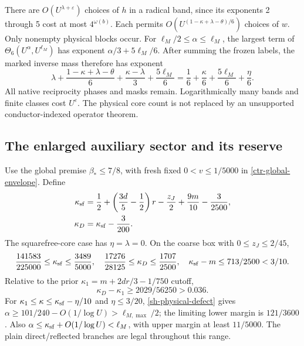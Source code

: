 \documentclass[11pt]{article}
\theoremstyle{definition}
\newcommand{\eps}{\varepsilon}
\begin{document}
There are $O(U^{\lambda+\eps})$ choices of $h$ in a radical band,
since its exponents 2 through 5 cost at most $4^{\omega(b)}$.
Each permits $O(U^{(1-\kappa+\lambda-\theta)/6})$ choices of $w$.
Only nonempty physical blocks occur. For
$\ell_M/2\le\alpha\le\ell_M$, the largest term of
$\Theta_6(U^\alpha,U^{\ell_M})$ has exponent
$\alpha/3+5\ell_M/6$. After summing the frozen labels, the marked
inverse mass therefore has exponent
\begin{equation}\label{sh-defect-mass}
 \lambda+\frac{1-\kappa+\lambda-\theta}{6}
       +\frac{\kappa-\lambda}{3}+\frac{5\ell_M}{6}
 =\frac16+\frac{\kappa}{6}+\frac{5\ell_M}{6}+\frac{\eta}{6}.
\end{equation}
All native reciprocity phases and masks remain. Logarithmically many
bands and finite classes cost $U^\eps$. The physical core count is
not replaced by an unsupported conductor-indexed operator theorem.

\subsection{The enlarged auxiliary sector and its reserve}
Use the global premise $\beta_*\le7/8$, with fresh fixed
$0<v\le1/5000$ in \eqref{ctr-global-envelope}. Define
\begin{align*}
 \kappa_{\rm sf}
 &=\frac12+\left(\frac{3d}{5}-\frac12\right)r
             -\frac{z_J}{2}+\frac{9m}{10}-\frac3{2500},\\
 \kappa_D&=\kappa_{\rm sf}-\frac3{200}.
\end{align*}
The squarefree-core case has $\eta=\lambda=0$.
On the coarse box with $0\le z_J\le2/45$,
\[
 \frac{141583}{225000}\le\kappa_{\rm sf}\le\frac{3489}{5000},
 \quad \frac{17276}{28125}\le\kappa_D\le\frac{1707}{2500},
 \quad \kappa_{\rm sf}-m\le713/2500<3/10.
\]
Relative to the prior $\kappa_1=m+2dr/3-1/750$ cutoff,
\[
 \kappa_D-\kappa_1\ge2029/56250>0.036 .
\]
For $\kappa_1\le\kappa\le\kappa_{\rm sf}-\eta/10$ and $\eta\le3/20$,
\eqref{sh-physical-defect} gives
$\alpha\ge101/240-O(1/\log U)>\ell_{M,\max}/2$; the limiting lower margin is
$121/3600$. Also $\alpha\le\kappa_{\rm sf}+O(1/\log U)<\ell_M$, with upper
margin at least $11/5000$. The plain direct/reflected branches
are legal throughout this range.
\end{document}
